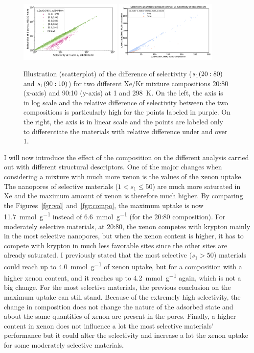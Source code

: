 \documentclass[main.tex]{subfiles}
\begin{document}
\begin{figure}[ht]
  \centering
    \includegraphics[width=0.45\textwidth]{figures/2-thermo/s_2080_vs_s_9010_overview_log.jpg}
    \includegraphics[width=0.45\textwidth]{figures/2-thermo/s_2080_vs_s_9010_overview.jpg}
    \caption{Illustration (scatterplot) of the difference of selectivity ($s_{\text{1}}(20:80)$ and $s_{\text{1}}(90:10)$) for two different Xe/Kr mixture compositions 20:80 (x-axis) and 90:10 (y-axis) at \SI{1}{\atm} and \SI{298}{\kelvin}. On the left, the axis is in log scale and the relative difference of selectivity between the two compositions is particularly high for the points labeled in purple. On the right, the axis is in linear scale and the points are labeled only to differentiate the materials with relative difference under and over $1$.}\label{fgr:SI:overview_2080_9010}
  \end{figure}

I will now introduce the effect of the composition on the different analysis carried out with different structural descriptors. One of the major changes when considering a mixture with much more xenon is the values of the xenon uptake. The nanopores of selective materials ($1<s_1\leq 50$) are much more saturated in Xe and the maximum amount of xenon is therefore much higher. By comparing the Figures~\ref{fgr:vol} and~\ref{fgr:compo}, the maximum uptake is now \SI{11.7}{\milli\mole\per\gram} instead of \SI{6.6}{\milli\mole\per\gram} (for the 20:80 composition). For moderately selective materials, at 20:80, the xenon competes with krypton mainly in the most selective nanopores, but when the xenon content is higher, it has to compete with krypton in much less favorable sites since the other sites are already saturated. I previously stated that the most selective ($s_1>50$) materials could reach up to \SI{4.0}{\milli\mole\per\gram} of xenon uptake, but for a composition with a higher xenon content, and it reaches up to \SI{4.2}{\milli\mole\per\gram} again, which is not a big change. For the most selective materials, the previous conclusion on the maximum uptake can still stand. Because of the extremely high selectivity, the change in composition does not change the nature of the adsorbed state and about the same quantities of xenon are present in the pores. Finally, a higher content in xenon does not influence a lot the most selective materials' performance but it could alter the selectivity and increase a lot the xenon uptake for some moderately selective materials.
\end{document}
